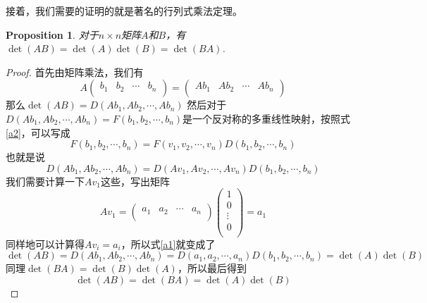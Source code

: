 \documentclass[11pt,a4paper,openany]{book}%
\theoremstyle{plain}%
\newtheorem{pro}{Proposition}[chapter]%
\begin{document}
\indent 接着，我们需要的证明的就是著名的行列式乘法定理。
\begin{pro}
对于$n\times n$矩阵$A$和$B$，有$\det (AB)=\det (A) \det (B)=\det (BA)$.
\end{pro}
\begin{proof}
首先由矩阵乘法，我们有
\[
A
\begin{pmatrix}
b_{1} & b_{2} & \cdots & b_{n}\\
\end{pmatrix}
=
\begin{pmatrix}
Ab_{1} & Ab_{2} & \cdots & Ab_{n}\\
\end{pmatrix}
\]
那么$\det (AB)=D(Ab_{1},Ab_{2},\cdots,Ab_{n})$
然后对于$D(Ab_{1},Ab_{2},\cdots,Ab_{n})=F(b_{1},b_{2},\cdots,b_{n})$是一个反对称的多重线性映射，按照式\eqref{a2}，可以写成
\[
F(b_{1},b_{2},\cdots,b_{n})=F(v_1,v_2,\cdots,v_n)D(b_{1},b_{2},\cdots,b_{n})
\]
也就是说
\begin{equation}
\label{a1}
D(Ab_{1},Ab_{2},\cdots,Ab_{n})=D(Av_1,Av_2,\cdots,Av_n)D(b_{1},b_{2},\cdots,b_{n})
\end{equation}
我们需要计算一下$Av_1$这些，写出矩阵
\[
Av_1=\begin{pmatrix}
a_{1} & a_{2} & \cdots & a_{n}\\
\end{pmatrix}
\begin{pmatrix}
1\\
0\\
\vdots \\
0\\
\end{pmatrix}
=a_{1}
\]
同样地可以计算得$Av_i=a_i$，所以式\eqref{a1}就变成了
\[
\det (AB)=D(Ab_{1},Ab_{2},\cdots,Ab_{n})=D(a_1,a_2,\cdots,a_n)D(b_{1},b_{2},\cdots,b_{n})=\det (A)\det (B)
\]
同理$\det (BA)=\det (B)\det (A)$，所以最后得到
\begin{equation}
\det (AB)=\det (BA)=\det (A)\det (B)
\end{equation}
\end{proof}
\end{document}

